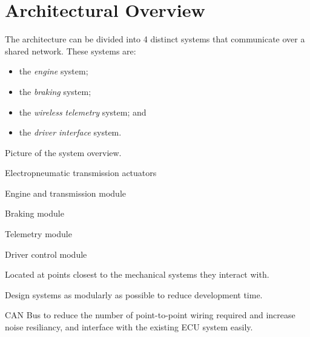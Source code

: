 \section{Architectural Overview}

The architecture can be divided into 4 distinct systems that communicate over a shared network. These systems are:

\begin{itemize}
\item the \emph{engine} system;
\item the \emph{braking} system;
\item the \emph{wireless telemetry} system; and
\item the \emph{driver interface} system.
\end{itemize}

Picture of the system overview.

Electropneumatic transmission actuators

Engine and transmission module

Braking module

Telemetry module

Driver control module

Located at points closest to the mechanical systems they interact with.

Design systems as modularly as possible to reduce development time.

CAN Bus to reduce the number of point-to-point wiring required and increase noise resiliancy, and interface with the existing ECU system easily.

